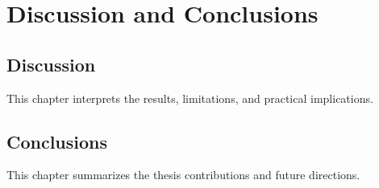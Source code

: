 \chapter{Discussion and Conclusions}
\label{ch:discussion-conclusions}

\section{Discussion}

This chapter interprets the results, limitations, and practical implications.

\section{Conclusions}

This chapter summarizes the thesis contributions and future directions.



